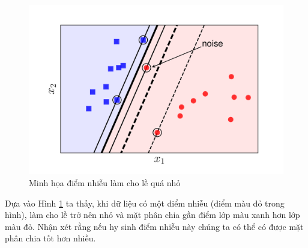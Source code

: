 \documentclass[a4paper, 12pt, oneside]{report}
\begin{document}
\begin{center}
    \begin{figure}[H]
    \begin{center}
     \includegraphics[scale=0.1]{ssvm1.png}
    \end{center}
    \caption{Minh họa điểm nhiễu làm cho lề quá nhỏ}
    \label{Hình 2.3}
    \end{figure}
\end{center} 
Dựa vào Hình \ref{Hình 2.3} ta thấy, khi dữ liệu có một điểm nhiễu (điểm màu đỏ trong hình), làm cho lề trở nên nhỏ và mặt phân chia gần điểm lớp màu xanh hơn lớp màu đỏ. Nhận xét rằng nếu hy sinh điểm nhiễu này chúng ta có thể có được mặt phân chia tốt hơn nhiều. 
\end{document}
